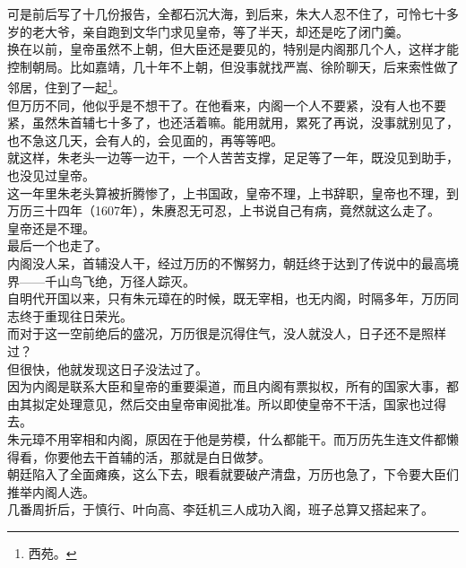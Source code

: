 \begin{multicols}{\theparacolNo}
可是前后写了十几份报告，全都石沉大海，到后来，朱大人忍不住了，可怜七十多岁的老大爷，亲自跑到文华门求见皇帝，等了半天，却还是吃了闭门羹。\\

换在以前，皇帝虽然不上朝，但大臣还是要见的，特别是内阁那几个人，这样才能控制朝局。比如嘉靖，几十年不上朝，但没事就找严嵩、徐阶聊天，后来索性做了邻居，住到了一起\footnote{西苑。}。\\

但万历不同，他似乎是不想干了。在他看来，内阁一个人不要紧，没有人也不要紧，虽然朱首辅七十多了，也还活着嘛。能用就用，累死了再说，没事就别见了，也不急这几天，会有人的，会见面的，再等等吧。\\

就这样，朱老头一边等一边干，一个人苦苦支撑，足足等了一年，既没见到助手，也没见过皇帝。\\

这一年里朱老头算被折腾惨了，上书国政，皇帝不理，上书辞职，皇帝也不理，到万历三十四年（1607年），朱赓忍无可忍，上书说自己有病，竟然就这么走了。\\

皇帝还是不理。\\

最后一个也走了。\\

内阁没人呆，首辅没人干，经过万历的不懈努力，朝廷终于达到了传说中的最高境界——千山鸟飞绝，万径人踪灭。\\

自明代开国以来，只有朱元璋在的时候，既无宰相，也无内阁，时隔多年，万历同志终于重现往日荣光。\\

而对于这一空前绝后的盛况，万历很是沉得住气，没人就没人，日子还不是照样过？\\

但很快，他就发现这日子没法过了。\\

因为内阁是联系大臣和皇帝的重要渠道，而且内阁有票拟权，所有的国家大事，都由其拟定处理意见，然后交由皇帝审阅批准。所以即使皇帝不干活，国家也过得去。\\

朱元璋不用宰相和内阁，原因在于他是劳模，什么都能干。而万历先生连文件都懒得看，你要他去干首辅的活，那就是白日做梦。\\

朝廷陷入了全面瘫痪，这么下去，眼看就要破产清盘，万历也急了，下令要大臣们推举内阁人选。\\

几番周折后，于慎行、叶向高、李廷机三人成功入阁，班子总算又搭起来了。\\


\end{multicols}
